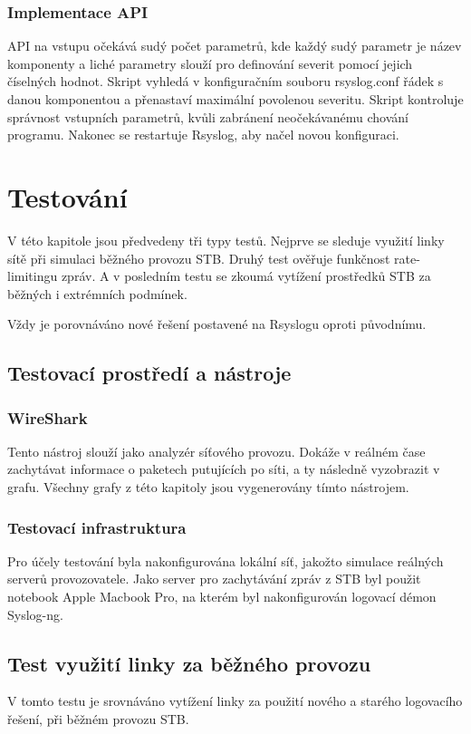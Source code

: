 \documentclass[thesis=B,czech]{FITthesis}[2012/06/26]
\begin{document}
\subsection{Implementace API}
API na vstupu očekává sudý počet parametrů, kde každý sudý parametr je název komponenty a liché parametry slouží pro definování severit pomocí jejich číselných hodnot.
Skript vyhledá v konfiguračním souboru rsyslog.conf řádek s danou komponentou a přenastaví maximální povolenou severitu. Skript kontroluje správnost vstupních parametrů, kvůli zabránení neočekávanému chování programu. Nakonec se restartuje Rsyslog, aby načel novou konfiguraci.


\chapter{Testování}
V této kapitole jsou předvedeny tři typy testů.
Nejprve se sleduje využití linky sítě při simulaci běžného provozu STB. Druhý test ověřuje funkčnost rate-limitingu zpráv. A v posledním testu se zkoumá vytížení prostředků STB za běžných i extrémních podmínek.

Vždy je porovnáváno nové řešení postavené na Rsyslogu oproti původnímu.

\section{Testovací prostředí a nástroje}

\subsection{WireShark}
Tento nástroj slouží jako analyzér síťového provozu. Dokáže v reálném čase zachytávat informace o paketech putujících po síti, a ty následně vyzobrazit v grafu. Všechny grafy z této kapitoly jsou vygenerovány tímto nástrojem.

\subsection{Testovací infrastruktura}
Pro účely testování byla nakonfigurována lokální síť, jakožto simulace reálných serverů provozovatele. Jako server pro zachytávání zpráv z STB byl použit notebook Apple Macbook Pro, na kterém byl nakonfigurován logovací démon Syslog-ng.

\section{Test využití linky za běžného provozu}
 V tomto testu je srovnáváno vytížení linky za použití nového a starého logovacího řešení, při běžném provozu STB. 
\end{document}

